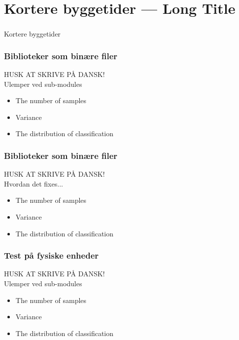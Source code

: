 \section[Kortere byggetider]{Kortere byggetider --- Long Title}

\begin{frame}
  \frametitle{}
  \begin{center}
    {\Huge Kortere byggetider}
  \end{center}
\end{frame}

\begin{frame}
    \frametitle{Biblioteker som binære filer}
    HUSK AT SKRIVE PÅ DANSK!\\
    Ulemper ved sub-modules
    \begin{itemize}
        \item The number of samples
        \item Variance
        \item The distribution of classification
    \end{itemize}
\end{frame}

\begin{frame}
    \frametitle{Biblioteker som binære filer}
    HUSK AT SKRIVE PÅ DANSK!\\
    Hvordan det fixes...
    \begin{itemize}
        \item The number of samples
        \item Variance
        \item The distribution of classification
    \end{itemize}
\end{frame}

\begin{frame}
    \frametitle{Test på fysiske enheder}
    HUSK AT SKRIVE PÅ DANSK!\\
    Ulemper ved sub-modules
    \begin{itemize}
        \item The number of samples
        \item Variance
        \item The distribution of classification
    \end{itemize}
\end{frame}

